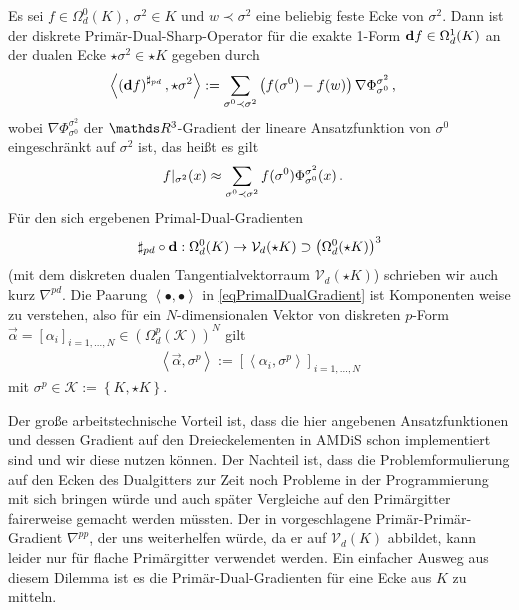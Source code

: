  \begin{definition}
    Es sei \( f\in\Omega^{0}_{d}(K) \), \( \sigma^{2}\in K \) und \( w\prec \sigma^{2} \) eine beliebig feste Ecke von \( \sigma^{2} \).
    Dann ist der diskrete Primär-Dual-Sharp-Operator für die exakte 1-Form \( \mathbf{d} f \in \Omega^{1}_{d}(K) \) an der dualen Ecke
    \( \star\sigma^{2}\in \star K \) gegeben durch
    \begin{align}
      \label{eqPrimalDualGradient}
      \left\langle \left( \mathbf{d} f \right)^{\sharp_{pd}} , \star\sigma^{2}\right\rangle
          &:= \sum_{\sigma^{0}\prec\sigma^{2}} \left( f(\sigma^{0}) - f(w) \right) \nabla\Phi_{\sigma^{0}}^{\sigma^{2}} \,\text{,}
    \end{align}
    wobei \( \nabla\Phi_{\sigma^{0}}^{\sigma^{2}} \) der \( \R^{3} \)-Gradient 
    der lineare Ansatzfunktion von \( \sigma^{0} \) eingeschränkt auf \( \sigma^{2} \) ist,
    das heißt es gilt
    \begin{align}
      f|_{\sigma^{2}}(x) &\approx \sum_{\sigma^{0}\prec\sigma^{2}} f(\sigma^{0}) \Phi_{\sigma^{0}}^{\sigma^{2}}(x) \,\text{.}
    \end{align}
    Für den sich ergebenen Primal-Dual-Gradienten
    \begin{align}
      \sharp_{pd}\circ\mathbf{d}: \Omega^{0}_{d}(K) \rightarrow \mathcal{V}_{d}(\star K) \supset \left( \Omega^{0}_{d}(\star K) \right)^{3}
    \end{align}
    (mit dem diskreten dualen Tangentialvektorraum \( \mathcal{V}_{d}(\star K) \)) schrieben wir auch kurz \( \nabla^{pd} \).
    Die Paarung \( \left\langle \bullet, \bullet  \right\rangle \) in \eqref{eqPrimalDualGradient} ist Komponenten weise zu verstehen, also
    für ein \( N \)-dimensionalen Vektor von diskreten \( p \)-Form 
    \( \vec\alpha=\left[ \alpha_{i} \right]_{i=1,\ldots,N}\in\left(\Omega^{p}_{d}(\mathcal{K})\right)^{N} \) 
    gilt
    \begin{align}
      \left\langle \vec\alpha, \sigma^{p} \right\rangle 
        := \left[ \left\langle \alpha_{i} , \sigma^{p} \right\rangle \right]_{i=1,\ldots,N}
    \end{align}
    mit \( \sigma^{p} \in \mathcal{K}:=\left\{ K, \star K \right\} \).
  \end{definition}
  Der große arbeitstechnische Vorteil ist, dass die hier angebenen Ansatzfunktionen und dessen Gradient auf den Dreieckelementen in AMDiS
  schon implementiert sind und wir diese nutzen können.
  Der Nachteil ist, dass die Problemformulierung auf den Ecken des Dualgitters zur Zeit noch Probleme in der Programmierung mit sich
  bringen würde und auch später Vergleiche auf den Primärgitter fairerweise gemacht werden müssten.
  Der in \cite{hirani} vorgeschlagene Primär-Primär-Gradient \( \nabla^{pp} \), der uns weiterhelfen würde, da er auf \( \mathcal{V}_{d}(K) \)
  abbildet, kann leider nur für flache Primärgitter verwendet werden.
  Ein einfacher Ausweg aus diesem Dilemma ist es die Primär-Dual-Gradienten für eine Ecke aus \( K \) zu mitteln.

